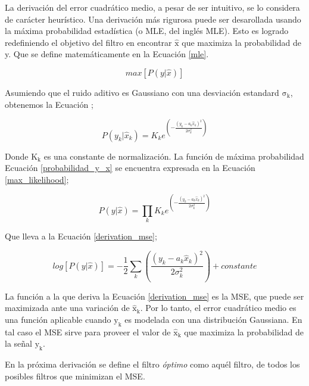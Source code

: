 \documentclass[10pt,a4paper]{article}
\begin{document}
La derivaci\'on del error cuadr\'atico medio, a pesar de ser intuitivo, se lo
considera de car\'acter heur\'istico. Una derivaci\'on m\'as rigurosa puede ser
desarollada usando la m\'axima probabilidad estad\'istica (o \acrshort{MLE}, del
ingl\'es \acrlong{MLE}). Esto es logrado redefiniendo el objetivo del filtro en
encontrar $\mathrm{\hat{x}}$ que maximiza la probabilidad de y. Que se define
matem\'aticamente en la Ecuaci\'on \ref{mle}.

\begin{equation}
    max\left[P\left(y|\hat{x}\right)\right] \label{mle}
\end{equation}

Asumiendo que el ruido aditivo es Gaussiano con una desviaci\'on estandard
$\mathrm{\sigma_k}$, obtenemos la Ecuaci\'on \label{probabilidad_y_x};

\begin{equation}
    P\left(y_k|\hat{x}_k\right) = K_ke^{\left(- \frac{(y_k - a_k\hat{x}_k)^2}{2\sigma^2_k}\right)} \label{probabilidad_y_x}
\end{equation}

Donde $\mathrm{K_k}$ es una constante de normalizaci\'on. La funci\'on de
m\'axima probabilidad Ecuaci\'on \ref{probabilidad_y_x} se encuentra expresada
en la Ecuaci\'on \ref{max_likelihood};

\begin{equation}
    P(y|\hat{x}) = \prod_k K_ke^{\left(- \frac{(y_k - a_k\hat{x}_k)^2}{2\sigma^2_k}\right)} \label{max_likelihood}
\end{equation}

Que lleva a la Ecuaci\'on \ref{derivation_mse};

\begin{equation}
    log[P\left(y|\hat{x}\right)] = - \frac{1}{2}\sum_k \left(\frac{(y_k -
    a_k\hat{x}_k)^2}{2\sigma^2_k}\right) + constante \label{derivation_mse}
\end{equation}

La funci\'on a la que deriva la Ecuaci\'on \ref{derivation_mse} es la
\acrshort{MSE}, que puede ser maximizada ante una variaci\'on de
$\mathrm{\hat{x}_k}$. Por lo tanto, el error cuadr\'atico medio es una funci\'on
aplicable cuando $\mathrm{y_k}$ es modelada con una distribuci\'on Gaussiana.
En tal caso el \acrshort{MSE} sirve para proveer el valor de
$\mathrm{\hat{x}_k}$ que maximiza la probabilidad de la señal $\mathrm{y_k}$.

En la pr\'oxima derivaci\'on se define el filtro \emph{\'optimo} como aqu\'el
filtro, de todos los posibles filtros que minimizan el \acrshort{MSE}.
\end{document}
